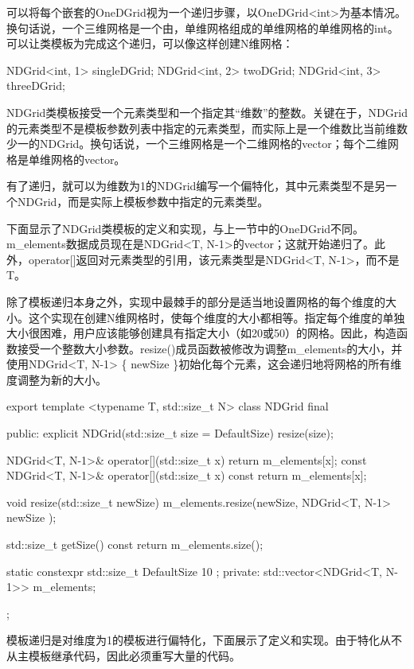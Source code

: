 可以将每个嵌套的OneDGrid视为一个递归步骤，以OneDGrid<int>为基本情况。换句话说，一个三维网格是一个由，单维网格组成的单维网格的单维网格的int。可以让类模板为完成这个递归，可以像这样创建N维网格：

\begin{cpp}
NDGrid<int, 1> singleDGrid;
NDGrid<int, 2> twoDGrid;
NDGrid<int, 3> threeDGrid;
\end{cpp}

NDGrid类模板接受一个元素类型和一个指定其“维数”的整数。关键在于，NDGrid的元素类型不是模板参数列表中指定的元素类型，而实际上是一个维数比当前维数少一的NDGrid。换句话说，一个三维网格是一个二维网格的vector；每个二维网格是单维网格的vector。

有了递归，就可以为维数为1的NDGrid编写一个偏特化，其中元素类型不是另一个NDGrid，而是实际上模板参数中指定的元素类型。

下面显示了NDGrid类模板的定义和实现，与上一节中的OneDGrid不同。m\_elements数据成员现在是NDGrid<T, N-1>的vector；这就开始递归了。此外，operator[]返回对元素类型的引用，该元素类型是NDGrid<T, N-1>，而不是T。

除了模板递归本身之外，实现中最棘手的部分是适当地设置网格的每个维度的大小。这个实现在创建N维网格时，使每个维度的大小都相等。指定每个维度的单独大小很困难，用户应该能够创建具有指定大小（如20或50）的网格。因此，构造函数接受一个整数大小参数。resize()成员函数被修改为调整m\_elements的大小，并使用NDGrid<T, N-1> \{ newSize \}初始化每个元素，这会递归地将网格的所有维度调整为新的大小。

\begin{cpp}
export template <typename T, std::size_t N>
class NDGrid final
{
    public:
        explicit NDGrid(std::size_t size = DefaultSize) { resize(size); }

        NDGrid<T, N-1>& operator[](std::size_t x) { return m_elements[x]; }
        const NDGrid<T, N-1>& operator[](std::size_t x) const {
            return m_elements[x]; }

        void resize(std::size_t newSize)
        {
            m_elements.resize(newSize, NDGrid<T, N-1> { newSize });
        }

        std::size_t getSize() const { return m_elements.size(); }

        static constexpr std::size_t DefaultSize { 10 };
    private:
        std::vector<NDGrid<T, N-1>> m_elements;
};
\end{cpp}

模板递归是对维度为1的模板进行偏特化，下面展示了定义和实现。由于特化从不从主模板继承代码，因此必须重写大量的代码。

